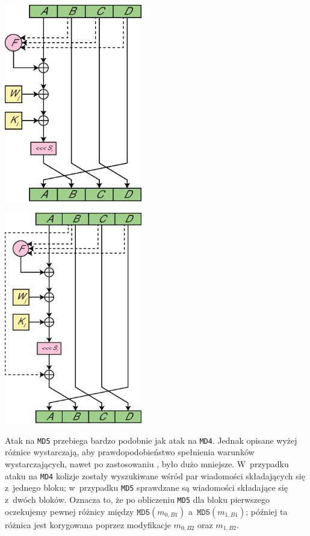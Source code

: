 \documentclass[12pt,a4paper,twoside]{article}
\begin{document}
\begin{multicols}{2}
\begingroup
    \centering
    \includegraphics[width=6cm]{img/md4_operation.eps}
    \label{fig:md4_operation}
\endgroup

\begingroup
    \centering
    \includegraphics[width=6cm]{img/md5_operation.eps}
    \label{fig:md5_operation}
\endgroup
\end{multicols}


Atak na \texttt{MD5} przebiega bardzo podobnie jak atak na \texttt{MD4}. Jednak
opisane wyżej różnice wystarczają, aby prawdopodobieństwo spełnienia warunków
wystarczających, nawet po zastosowaniu , było
dużo mniejsze. W~przypadku ataku na \texttt{MD4} kolizje zostały wyszukiwane
wśród par wiadomości składających się z~jednego bloku; w~przypadku \texttt{MD5}
sprawdzane są wiadomości składające się z~dwóch bloków. Oznacza to, że po
obliczeniu \texttt{MD5} dla bloku pierwszego oczekujemy pewnej różnicy między
$\mathtt{MD5}(m_{0,B1})$ a~$\mathtt{MD5}(m_{1,B1})$; później ta różnica jest
korygowana poprzez modyfikacje $m_{0,B2}$ oraz $m_{1,B2}$.
\end{document}
